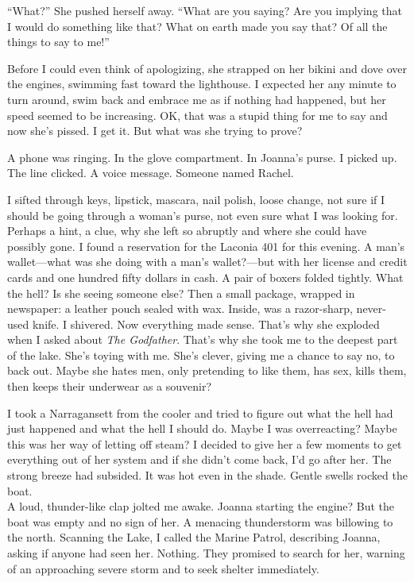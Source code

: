 ``What?'' She pushed herself away. ``What are you saying? Are you
implying that I would do something like that? What on earth made you say
that? Of all the things to say to me!''

Before I could even think of apologizing, she strapped on her bikini and
dove over the engines, swimming fast toward the lighthouse. I expected
her any minute to turn around, swim back and embrace me as if nothing
had happened, but her speed seemed to be increasing. OK, that was a
stupid thing for me to say and now she's pissed. I get it. But what was
she trying to prove?

A phone was ringing. In the glove compartment. In Joanna's purse. I
picked up. The line clicked. A voice message. Someone named Rachel.

I sifted through keys, lipstick, mascara, nail polish, loose change, not
sure if I should be going through a woman's purse, not even sure what I
was looking for. Perhaps a hint, a clue, why she left so abruptly and
where she could have possibly gone. I found a reservation for the
Laconia 401 for this evening. A man's wallet---what was she doing with a
man's wallet?---but with her license and credit cards and one hundred
fifty dollars in cash. A pair of boxers folded tightly. What the hell?
Is she seeing someone else? Then a small package, wrapped in newspaper:
a leather pouch sealed with wax. Inside, was a razor-sharp, never-used
knife. I shivered. Now everything made sense. That's why she exploded
when I asked about \emph{The Godfather}. That's why she took me to the
deepest part of the lake. She's toying with me. She's clever, giving me
a chance to say no, to back out. Maybe she hates men, only pretending to
like them, has sex, kills them, then keeps their underwear as a
souvenir?

I took a Narragansett from the cooler and tried to figure out what the
hell had just happened and what the hell I should do. Maybe I was
overreacting? Maybe this was her way of letting off steam? I decided to
give her a few moments to get everything out of her system and if she
didn't come back, I'd go after her. The strong breeze had subsided. It
was hot even in the shade. Gentle swells rocked the boat.\\

A loud, thunder-like clap jolted me awake. Joanna starting the engine?
But the boat was empty and no sign of her. A menacing thunderstorm was
billowing to the north. Scanning the Lake, I called the Marine Patrol,
describing Joanna, asking if anyone had seen her. Nothing. They promised
to search for her, warning of an approaching severe storm and to seek
shelter immediately.

